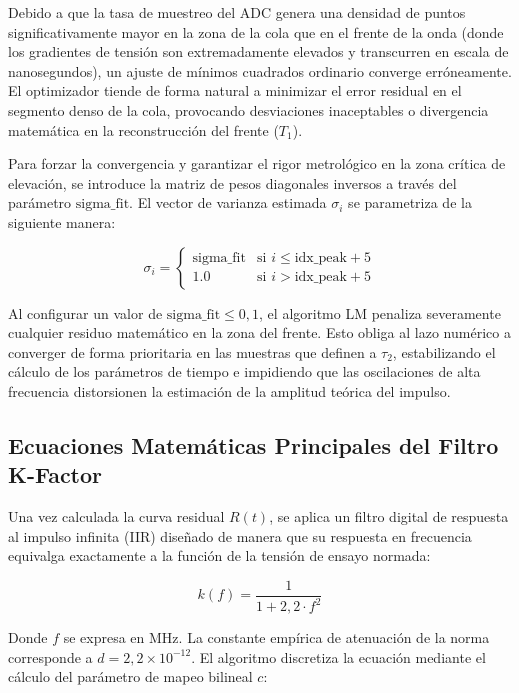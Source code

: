 Debido a que la tasa de muestreo del ADC genera una densidad de puntos significativamente mayor en la zona de la cola que en el frente de la onda (donde los gradientes de tensión son extremadamente elevados y transcurren en escala de nanosegundos), un ajuste de mínimos cuadrados ordinario converge erróneamente. El optimizador tiende de forma natural a minimizar el error residual en el segmento denso de la cola, provocando desviaciones inaceptables o divergencia matemática en la reconstrucción del frente ($T_1$).

Para forzar la convergencia y garantizar el rigor metrológico en la zona crítica de elevación, se introduce la matriz de pesos diagonales inversos a través del parámetro $\text{sigma\_fit}$. El vector de varianza estimada $\sigma_i$ se parametriza de la siguiente manera:

\begin{equation}
    \sigma_i = \begin{cases} 
        \text{sigma\_fit} & \text{si } i \le \text{idx\_peak} + 5 \\ 
        1.0 & \text{si } i > \text{idx\_peak} + 5 
    \end{cases}
    \label{eq:varianza_estimada}
\end{equation}

Al configurar un valor de $\text{sigma\_fit} \le 0,1$, el algoritmo LM penaliza severamente cualquier residuo matemático en la zona del frente. Esto obliga al lazo numérico a converger de forma prioritaria en las muestras que definen a $\tau_2$, estabilizando el cálculo de los parámetros de tiempo e impidiendo que las oscilaciones de alta frecuencia distorsionen la estimación de la amplitud teórica del impulso.

\subsection{Ecuaciones Matemáticas Principales del Filtro K-Factor}
Una vez calculada la curva residual $R(t)$, se aplica un filtro digital de respuesta al impulso infinita (IIR) diseñado de manera que su respuesta en frecuencia equivalga exactamente a la función de la tensión de ensayo normada:

\begin{equation}
k(f) = \frac{1}{1 + 2,2 \cdot f^2}
\end{equation}

Donde $f$ se expresa en $\text{MHz}$. La constante empírica de atenuación de la norma corresponde a $d = 2,2 \times 10^{-12}$. El algoritmo discretiza la ecuación mediante el cálculo del parámetro de mapeo bilineal $c$:

